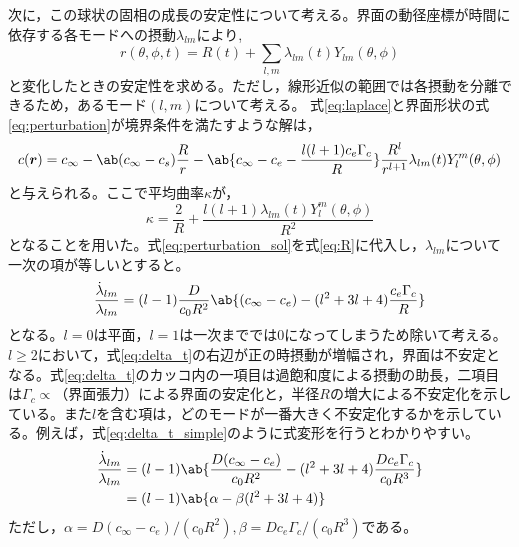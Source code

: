 \documentclass[autodetect-engine,dvi=dvipdfmx,a4paper,ja=standard,oneside,openany,11pt]{bxjsbook}
\begin{document}
次に，この球状の固相の成長の安定性について考える。界面の動径座標が時間に依存する各モードへの摂動$\lambda_{lm}$により,
\begin{equation}
  r(\theta,\phi,t) = R(t) + \sum_{l,m} \lambda_{lm}(t)Y_{lm}(\theta,\phi)
  \label{eq:perturbation}
\end{equation}
と変化したときの安定性を求める。ただし，線形近似の範囲では各摂動を分離できるため，あるモード$(l,m)$について考える。
式\eqref{eq:laplace}と界面形状の式\eqref{eq:perturbation}が境界条件を満たすような解は，
\begin{equation}
  \begin{split}
    c(\bm{r})=c_{\infty}-\ab(c_{\infty}-c_s)\frac{R}{r}-\ab\{c_\infty-c_e-\frac{l(l+1)c_e\Gamma_c}{R}\}\frac{R^l}{r^{l+1}}\lambda_{lm}(t)Y_{l}^{m}(\theta,\phi)
  \end{split}
  \label{eq:perturbation_sol}
\end{equation}
と与えられる。ここで平均曲率$\kappa$が，
\begin{equation}
  \kappa = \frac{2}{R}+\frac{l(l+1)\lambda_{lm}(t)Y_l^m(\theta,\phi)}{R^2}
  \label{eq:perturbation_curvature}
\end{equation}
となることを用いた。式\eqref{eq:perturbation_sol}を式\eqref{eq:R}に代入し，$\lambda_{lm}$について一次の項が等しいとすると。
\begin{equation}
  \frac{\dot{\lambda}_{lm}}{\lambda_{lm}} =(l-1)\frac{D}{c_0R^2}\ab\{(c_\infty-c_e)-(l^2+3l+4)\frac{c_e\Gamma_c}{R}\}
  \label{eq:delta_t}
\end{equation}
となる。$l=0$は平面，$l=1$は一次まででは0になってしまうため除いて考える。$l\geq2$において，式\eqref{eq:delta_t}の右辺が正の時摂動が増幅され，界面は不安定となる。式\eqref{eq:delta_t}のカッコ内の一項目は過飽和度による摂動の助長，二項目は$\Gamma_c\propto$（界面張力）による界面の安定化と，半径$R$の増大による不安定化を示している。また$l$を含む項は，どのモードが一番大きく不安定化するかを示している。例えば，式\eqref{eq:delta_t_simple}のように式変形を行うとわかりやすい。
\begin{equation}
  \begin{split}
    \frac{\dot{\lambda}_{lm}}{\lambda_{lm}} & =(l-1)\ab\{\frac{D(c_\infty-c_e)}{c_0R^2}-(l^2+3l+4)\frac{D c_e\Gamma_c}{c_0 R^3}\} \\
                                            & =(l-1)\ab\{\alpha-\beta(l^2+3l+4)\}
  \end{split}
  \label{eq:delta_t_simple}
\end{equation}
ただし，$\alpha=D(c_\infty-c_e)/(c_0R^2),\beta=D c_e\Gamma_c/(c_0 R^3)$である。
\end{document}
